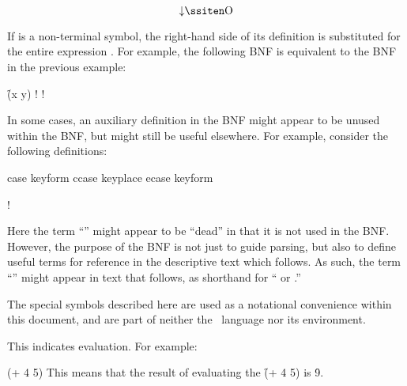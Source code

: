 $$\hbox{\down{O}}$$

\noindent If  is a non-terminal symbol, the right-hand side
of its definition is substituted for the entire expression 
.  For example, the following BNF is equivalent to
the BNF in the previous example:

\f{(x  y)}
\Vskip 1pc!
\Vskip 1pc!

\endsubsubsubsection%


In some cases, an auxiliary definition in the BNF might appear to be unused
within the BNF, but might still be useful elsewhere.  For example, consider the
following definitions:

\DefmacWithValues case
		  {keyform   }
		  {}
\DefmacWithValues ccase
		  {keyplace }
		  {}
\DefmacWithValues ecase
		  {keyform  }
		  {}

\Vskip 1pc!

Here the term ``'' might appear to be ``dead'' in that it
is not used in the BNF.  However, the purpose of the BNF is not just to guide parsing,
but also to define useful terms for reference in the descriptive text which follows.
As such, the term ``'' might appear in text that follows,
as shorthand for `` or .''

\endsubsubsubsection%

\endsubsubsection%

The special symbols described here are used as a notational convenience
within this document, and are part of neither the \clisp\ language nor
its environment.

\beginlist
\itemitem{\EV}

This indicates evaluation.
For example:

\code
 (+ 4 5)  
\endcode
This means that the result of
evaluating the  \f{(+ 4 5)} is \f{9}.
                                                                 
